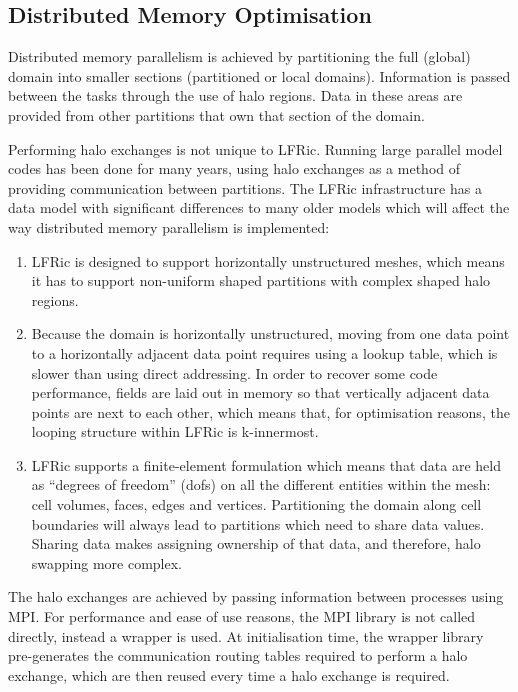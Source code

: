 \documentclass[review,times]{elsarticle}
\begin{document}
\subsection{\label{sec:distmem}Distributed Memory Optimisation}

Distributed memory parallelism is achieved by partitioning the full
(global) domain into smaller sections (partitioned or local domains).
Information is passed between the tasks through the use of halo regions.
Data in these areas are provided from other partitions that own that
section of the domain.

Performing halo exchanges is not unique to LFRic. Running large parallel
model codes has been done for many years, using halo exchanges as a
method of providing communication between partitions. The LFRic
infrastructure has a data model with significant differences to many
older models which will affect the way distributed memory parallelism is
implemented:

\begin{enumerate}

\item LFRic is designed to support horizontally unstructured meshes,
which means it has to support non-uniform shaped partitions with complex
shaped halo regions.

\item Because the domain is horizontally unstructured, moving from one
data point to a horizontally adjacent data point requires using a lookup
table, which is slower than using direct addressing. In order to recover
some code performance, fields are laid out in memory so that vertically
adjacent data points are next to each other, which means that, for
optimisation reasons, the looping structure within LFRic is k-innermost.

\item LFRic supports a finite-element formulation which means that data
are held as ``degrees of freedom'' (dofs) on all the different
entities within the mesh: cell volumes, faces, edges and vertices.
Partitioning the domain along cell boundaries will always lead to
partitions which need to share data values. Sharing data makes assigning
ownership of that data, and therefore, halo swapping more complex.

\end{enumerate}

The halo exchanges are achieved by passing information between processes
using MPI. For performance and ease of use reasons, the MPI library is
not called directly, instead a wrapper is used. At initialisation time,
the wrapper library pre-generates the communication routing tables
required to perform a halo exchange, which are then reused every time a
halo exchange is required.
\end{document}
